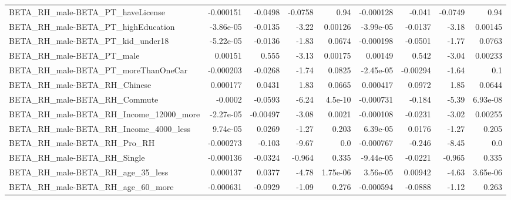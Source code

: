 \begin{tabular}{lrrrrrrrr}
BETA\_RH\_male-BETA\_PT\_haveLicense                   &   -0.000151 &      -0.0498 &   -0.0758 &     0.94 &  -0.000128 &      -0.041 &      -0.0749 &          0.94 \\
BETA\_RH\_male-BETA\_PT\_highEducation                 &   -3.86e-05 &      -0.0135 &     -3.22 &  0.00126 &  -3.99e-05 &     -0.0137 &        -3.18 &       0.00145 \\
BETA\_RH\_male-BETA\_PT\_kid\_under18                   &   -5.22e-05 &      -0.0136 &     -1.83 &   0.0674 &  -0.000198 &     -0.0501 &        -1.77 &        0.0763 \\
BETA\_RH\_male-BETA\_PT\_male                          &     0.00151 &        0.555 &     -3.13 &  0.00175 &    0.00149 &       0.542 &        -3.04 &       0.00233 \\
BETA\_RH\_male-BETA\_PT\_moreThanOneCar                &   -0.000203 &      -0.0268 &     -1.74 &   0.0825 &  -2.45e-05 &    -0.00294 &        -1.64 &           0.1 \\
BETA\_RH\_male-BETA\_RH\_Chinese                       &    0.000177 &       0.0431 &      1.83 &   0.0665 &   0.000417 &      0.0972 &         1.85 &        0.0644 \\
BETA\_RH\_male-BETA\_RH\_Commute                       &     -0.0002 &      -0.0593 &     -6.24 &  4.5e-10 &  -0.000731 &      -0.184 &        -5.39 &      6.93e-08 \\
BETA\_RH\_male-BETA\_RH\_Income\_12000\_more             &   -2.27e-05 &     -0.00497 &     -3.08 &   0.0021 &  -0.000108 &     -0.0231 &        -3.02 &       0.00255 \\
BETA\_RH\_male-BETA\_RH\_Income\_4000\_less              &    9.74e-05 &       0.0269 &     -1.27 &    0.203 &   6.39e-05 &      0.0176 &        -1.27 &         0.205 \\
BETA\_RH\_male-BETA\_RH\_Pro\_RH                        &   -0.000273 &       -0.103 &     -9.67 &      0.0 &  -0.000767 &      -0.246 &        -8.45 &           0.0 \\
BETA\_RH\_male-BETA\_RH\_Single                        &   -0.000136 &      -0.0324 &    -0.964 &    0.335 &  -9.44e-05 &     -0.0221 &       -0.965 &         0.335 \\
BETA\_RH\_male-BETA\_RH\_age\_35\_less                   &    0.000137 &       0.0377 &     -4.78 & 1.75e-06 &   3.56e-05 &     0.00942 &        -4.63 &      3.65e-06 \\
BETA\_RH\_male-BETA\_RH\_age\_60\_more                   &   -0.000631 &      -0.0929 &     -1.09 &    0.276 &  -0.000594 &     -0.0888 &        -1.12 &         0.263 \\

\end{tabular}
